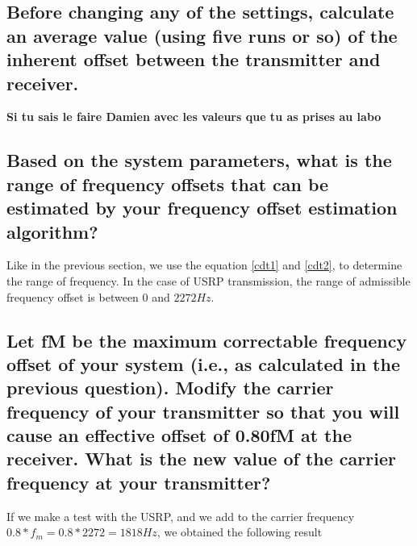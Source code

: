 \documentclass[frenchb, oneside, headings=normal]{scrartcl}
\begin{document}
\subsection{Before changing any of the settings, calculate an average value (using five runs or so) of the inherent offset between the transmitter and receiver.}

\textbf{Si tu sais le faire Damien avec les valeurs que tu as prises au labo}

\subsection{Based on the system parameters, what is the range of frequency offsets that can be estimated by your frequency offset estimation algorithm?}

Like in the previous section, we use the equation \ref{cdt1} and \ref{cdt2}, to determine the range of frequency. In the case of USRP transmission, the range of admissible frequency offset is between $0$ and $2272 Hz$.

\newpage

\subsection{Let fM be the maximum correctable frequency offset of your system (i.e., as calculated in the previous question). Modify the carrier frequency of your transmitter so that you will cause an effective offset of 0.80fM at the receiver. What is the new value of the carrier frequency at your transmitter?}

If we make a test with the USRP, and we add to the carrier frequency $0.8*f_m=0.8*2272=1818 Hz$, we obtained the following result
\end{document}
